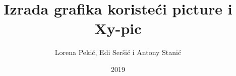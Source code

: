 \documentclass{beamer}
\title{Izrada grafika koristeći picture i Xy-pic}
\author{Lorena Pekić, Edi Seršić i Antony Stanić}
\date{2019}
\begin{document}
\frame{\titlepage}


%

\end{document}
